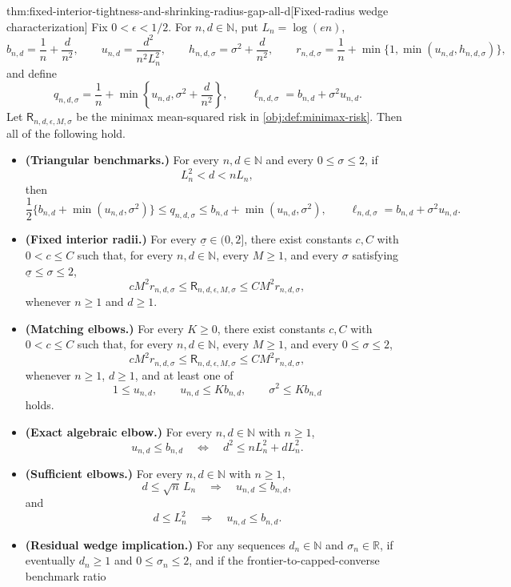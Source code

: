 \documentclass[11pt]{article}
\begin{document}
\begin{theoremv}{thm:fixed-interior-tightness-and-shrinking-radius-gap-all-d}[Fixed-radius wedge characterization]
Fix \(0<\epsilon<1/2\).  For \(n,d\in\mathbb N\), put \(L_n=\log(en)\),
\[
b_{n,d}=\frac1n+\frac d{n^2},
\qquad
u_{n,d}=\frac{d^2}{n^2L_n^2},
\qquad
h_{n,d,\sigma}=\sigma^2+\frac d{n^2},
\qquad
r_{n,d,\sigma}=\frac1n+\min\{1,\min(u_{n,d},h_{n,d,\sigma})\},
\]
and define
\[
q_{n,d,\sigma}=\frac1n+\min\left\{u_{n,d},\sigma^2+\frac d{n^2}\right\},
\qquad
\ell_{n,d,\sigma}=b_{n,d}+\sigma^2u_{n,d}.
\]
Let \(\mathsf R_{n,d,\epsilon,M,\sigma}\) be the minimax mean-squared risk in \cref{obj:def:minimax-risk}.  Then all of the following hold.
\begin{itemize}
\item \textbf{(Triangular benchmarks.)} For every \(n,d\in\mathbb N\) and every \(0\le\sigma\le2\), if
\[
L_n^2<d<nL_n,
\]
then
\[
\frac12\{b_{n,d}+\min(u_{n,d},\sigma^2)\}
\le q_{n,d,\sigma}
\le b_{n,d}+\min(u_{n,d},\sigma^2),
\qquad
\ell_{n,d,\sigma}=b_{n,d}+\sigma^2u_{n,d}.
\]
\item \textbf{(Fixed interior radii.)} For every \(\underline\sigma\in(0,2]\), there exist constants \(c,C\) with \(0<c\le C\) such that, for every \(n,d\in\mathbb N\), every \(M\ge1\), and every \(\sigma\) satisfying \(\underline\sigma\le\sigma\le2\),
\[
cM^2r_{n,d,\sigma}
\le
\mathsf R_{n,d,\epsilon,M,\sigma}
\le
CM^2r_{n,d,\sigma},
\]
whenever \(n\ge1\) and \(d\ge1\).
\item \textbf{(Matching elbows.)} For every \(K\ge0\), there exist constants \(c,C\) with \(0<c\le C\) such that, for every \(n,d\in\mathbb N\), every \(M\ge1\), and every \(0\le\sigma\le2\),
\[
cM^2r_{n,d,\sigma}
\le
\mathsf R_{n,d,\epsilon,M,\sigma}
\le
CM^2r_{n,d,\sigma},
\]
whenever \(n\ge1\), \(d\ge1\), and at least one of
\[
1\le u_{n,d},
\qquad
u_{n,d}\le Kb_{n,d},
\qquad
\sigma^2\le Kb_{n,d}
\]
holds.
\item \textbf{(Exact algebraic elbow.)} For every \(n,d\in\mathbb N\) with \(n\ge1\),
\[
u_{n,d}\le b_{n,d}
\quad\Longleftrightarrow\quad
d^2\le nL_n^2+dL_n^2.
\]
\item \textbf{(Sufficient elbows.)} For every \(n,d\in\mathbb N\) with \(n\ge1\),
\[
d\le\sqrt n\,L_n \quad\Longrightarrow\quad u_{n,d}\le b_{n,d},
\]
and
\[
d\le L_n^2 \quad\Longrightarrow\quad u_{n,d}\le b_{n,d}.
\]
\item \textbf{(Residual wedge implication.)} For any sequences \(d_n\in\mathbb N\) and \(\sigma_n\in\mathbb R\), if eventually \(d_n\ge1\) and \(0\le\sigma_n\le2\), and if the frontier-to-capped-converse benchmark ratio

\end{itemize}
\end{theoremv}
\end{document}
